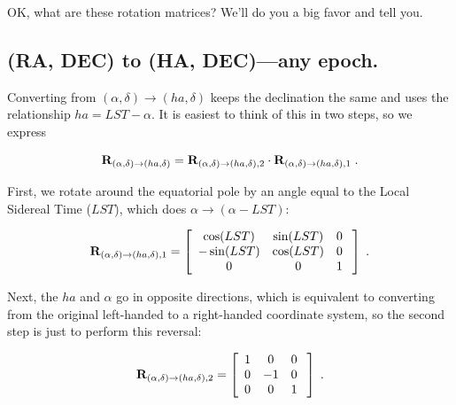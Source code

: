 \documentclass[11pt,preprint]{aastex}
\begin{document}
	OK, what are these rotation matrices? We'll do you a big favor
and tell you.  

\subsection {(RA, DEC) to (HA, DEC)---any epoch.}

	Converting from $(\alpha, \delta) \rightarrow (ha, \delta)$
keeps the declination the same and uses the relationship $ha = LST -
\alpha$.  It is easiest to think of this in two steps, so we express

\begin{equation} 
{\bf R}_{(\alpha, \delta) \rightarrow (ha, \delta)} = 
{\bf R}_{(\alpha, \delta) \rightarrow (ha, \delta), 2} \cdot 
{\bf R}_{(\alpha, \delta) \rightarrow (ha, \delta), 1} \; .
\end{equation} 

\noindent First, we rotate around the equatorial pole by an angle equal
to the Local Sidereal Time ($LST$), which does $\alpha \rightarrow
(\alpha - LST)$:

\begin{mathletters} 
\begin{eqnarray} 
{\bf R}_{(\alpha, \delta) \rightarrow (ha, \delta),1} = \left[ 
\begin{array}{ccc} 
    \cos(LST) & \sin(LST) &  0 \\
   -\sin(LST) & \cos(LST) &  0 \\
            0 &  0        &  1 \\
\end{array} 
\; \right] \; .
\end{eqnarray} 

\noindent Next, the $ha$ and $\alpha$ go in opposite directions, which
is equivalent to converting from the original left-handed to a
right-handed coordinate system, so the second step is just to perform
this reversal:

\begin{eqnarray} 
{\bf R}_{(\alpha, \delta) \rightarrow (ha, \delta), 2}  = \left[
\begin{array}{ccc}
    1 & 0 &  0 \\
    0 & -1&  0 \\
    0 &  0&  1 \\
\end{array} 
\; \right] \; .
\end{eqnarray} 
\end{mathletters} 
\end{document}
